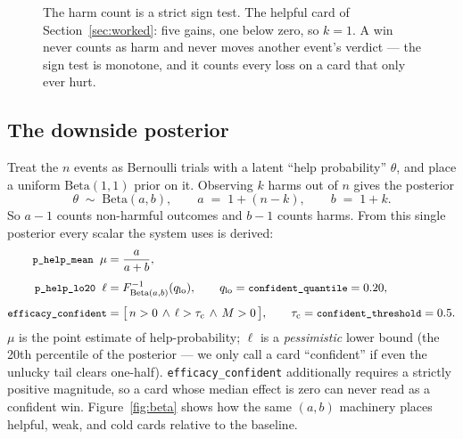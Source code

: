 \documentclass[11pt]{article}
\newcommand{\code}[1]{\texttt{\small #1}}
\newcommand{\Beta}{\mathrm{Beta}}
\begin{document}
\begin{figure}[ht]
\centering
{}
\caption{The harm count is a strict sign test. The helpful card of
Section~\ref{sec:worked}: five gains, one below zero, so $k=1$. A win never
counts as harm and never moves another event's verdict --- the sign test is
monotone, and it counts every loss on a card that only ever hurt.}
\label{fig:signtest}
\end{figure}

\subsection{The downside posterior}

Treat the $n$ events as Bernoulli trials with a latent ``help probability''
$\theta$, and place a uniform $\Beta(1,1)$ prior on it. Observing $k$ harms out of
$n$ gives the posterior
\[
  \theta \;\sim\; \Beta(a,b),
  \qquad
  a \;=\; 1 + (n-k),
  \qquad
  b \;=\; 1 + k .
\]
So $a-1$ counts non-harmful outcomes and $b-1$ counts harms. From this single
posterior every scalar the system uses is derived:
\begin{align}
  \text{\code{p\_help\_mean}} \;\;\mu &= \frac{a}{a+b}, \\[4pt]
  \text{\code{p\_help\_lo20}} \;\;\ell &= F^{-1}_{\Beta(a,b)}(q_{\text{lo}}),
    \qquad q_{\text{lo}} = \text{\code{confident\_quantile}} = 0.20, \\[4pt]
  \text{\code{efficacy\_confident}} &=
    \bigl[\, n>0 \,\wedge\, \ell > \tau_{\text{c}} \,\wedge\, M > 0 \,\bigr],
    \qquad \tau_{\text{c}} = \text{\code{confident\_threshold}} = 0.5 .
\end{align}
$\mu$ is the point estimate of help-probability; $\ell$ is a \emph{pessimistic}
lower bound (the 20th percentile of the posterior --- we only call a card
``confident'' if even the unlucky tail clears one-half). \code{efficacy\_confident}
additionally requires a strictly positive magnitude, so a card whose median effect
is zero can never read as a confident win. Figure~\ref{fig:beta} shows how the same
$(a,b)$ machinery places helpful, weak, and cold cards relative to the baseline.
\end{document}
